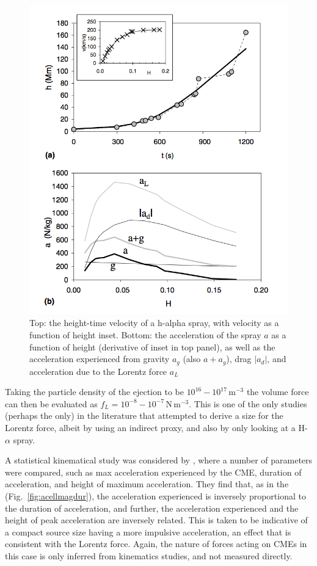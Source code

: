 \begin{figure}[ts!]
\begin{center}
\includegraphics[scale=0.35, trim=0cm 0cm 0cm 2cm]{images/vrsnak_lorentz}
\caption[Acceleration due to all forces acting on CME]{Top: the height-time velocity of a h-alpha spray, with velocity as a function of height inset. Bottom: the acceleration of the spray $a$ as a function of height (derivative of inset in top panel), as well as the acceleration experienced from gravity $a_g$ (also $a+a_g$), drag $|a_d|$, and acceleration due to the Lorentz force $a_L$ \citep{vrs06}}
\label{fig:vrsnak06}
\end{center}
\end{figure}
Taking the particle density of the ejection to be $10^{16}-10^{17}$\,m$^{-3}$ the volume force can then be evaluated as $f_L = 10^{-8}-10^{-7}$\,N\,m$^{-3}$. This is one of the only studies (perhaps the only) in the literature that attempted to derive a size for the Lorentz force, albeit by using an indirect proxy, and also by only looking at a H-$\alpha$ spray.


A statistical kinematical study was considered by \citep{bein2011}, where a number of parameters were compared, such as max acceleration experienced by the CME, duration of acceleration, and height of maximum acceleration. They find that, as in the \citet{zhang2006} (Fig.~\ref{fig:acellmagdur}), the acceleration experienced is inversely proportional to the duration of acceleration, and further, the acceleration experienced and the height of peak acceleration are inversely related. This is taken to be indicative of a compact source size having a more impulsive acceleration, an effect that is consistent with the Lorentz force. Again, the nature of forces acting on CMEs in this case is only inferred from kinematics studies, and not measured directly.

